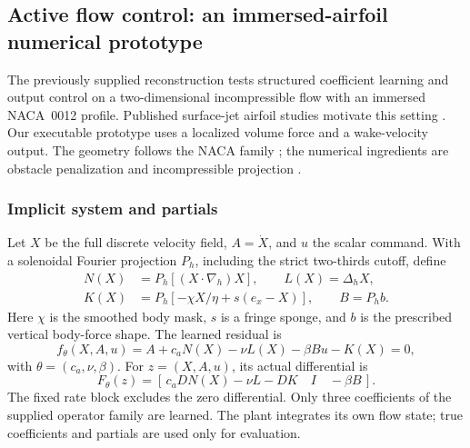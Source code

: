 \subsection{Active flow control: an immersed-airfoil numerical prototype}
\label{sec:afc_prototype}

The previously supplied reconstruction tests structured coefficient learning and
output control on a two-dimensional
incompressible flow with an immersed NACA~0012 profile. Published surface-jet
airfoil studies motivate this setting \cite{Garcia2025Airfoil,Montala2025Wing}.
Our executable prototype uses a localized volume force and a wake-velocity
output. The geometry follows the NACA family \cite{Jacobs1933NACA}; the
numerical ingredients are obstacle penalization and incompressible projection
\cite{Angot1999Penalization,Chorin1968Projection}.

\subsubsection{Implicit system and partials}
Let $X$ be the full discrete velocity field, $A=\dot X$, and $u$ the scalar
command. With a solenoidal Fourier projection $P_h$, including the strict
two-thirds cutoff, define
\begin{align}
 N(X)&=P_h[(X\cdot\nabla_h)X],\qquad L(X)=\Delta_hX,\nonumber\\
 K(X)&=P_h[-\chi X/\eta+s(e_x-X)],\qquad B=P_hb.
 \label{eq:afc_short_operators}
\end{align}
Here $\chi$ is the smoothed body mask, $s$ is a fringe sponge, and $b$ is
the prescribed vertical body-force shape. The learned residual is
\begin{equation}
 f_\theta(X,A,u)=A+c_aN(X)-\nu L(X)-\beta Bu-K(X)=0,
 \label{eq:afc_short_f}
\end{equation}
with $\theta=(c_a,\nu,\beta)$. For $z=(X,A,u)$, its actual differential is
\begin{equation}
 F_\theta(z)=
 [\,c_aDN(X)-\nu L-DK\quad I\quad-\beta B\,].
 \label{eq:afc_short_F}
\end{equation}
The fixed rate block excludes the zero differential. Only three coefficients
of the supplied operator family are learned. The plant integrates its own
flow state; true coefficients and partials are used only for evaluation.

